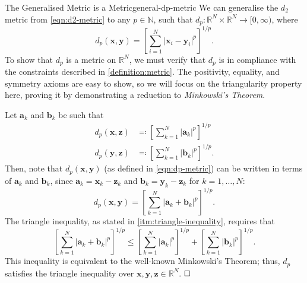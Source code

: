 \documentclass{article}
\renewcommand*\vec{\mathbf}
\renewcommand*\qedsymbol{\hfill\ensuremath{\Box}}
\numberwithin{equation}{section}
\numberwithin{enumi}{section}
\begin{document}
\begin{theorem}{The Generalised Metric is a Metric}{general-dp-metric}
    We can generalise the $d_2$ metric from \cref{eqn:d2-metric} to any $ p
    \in \mathbb{N} $, such that $ d_p \colon \mathbb{R}^N \times \mathbb{R}^N
    \to [0, \infty) $, where
    \begin{equation}
        d_p(\vec{x}, \vec{y}) = \left[\sum_{i=1}^N \vert \vec{x}_i - \vec{y}_i
            \vert^p\right]^{1/p} \label{eqn:dp-metric}.
    \end{equation}
    To show that $ d_p $ is a metric on $ \mathbb{R}^N $, we must verify that $
    d_p $ is in compliance with the constraints described in
    \cref{definition:metric}. The positivity, equality, and symmetry axioms are
    easy to show, so we will focus on the triangularity property here, proving
    it by demonstrating a reduction to \emph{Minkowski's Theorem}.

    Let $ \vec{a}_k $ and $ \vec{b}_k $ be such that
    \begin{align}
        d_p(\vec{x}, \vec{z}) &\eqcolon \left[\sum_{k=1}^N \vert \vec{a}_k
            \vert^p\right]^{1/p} \\
        d_p(\vec{y}, \vec{z}) &\eqcolon \left[\sum_{k=1}^N \vert \vec{b}_k
            \vert^p\right]^{1/p}.
    \end{align}
    Then, note that $ d_p(\vec{x}, \vec{y}) $ (as defined in
    \cref{eqn:dp-metric}) can be
    written in terms of $ \vec{a}_k $ and $ \vec{b}_k $, since $ \vec{a}_k =
    \vec{x}_k - \vec{z}_k $ and $ \vec{b}_k = \vec{y}_k - \vec{z}_k $ for
    $ k = 1, \ldots, N $:
    \begin{equation}
        d_p(\vec{x}, \vec{y}) = \left[\sum_{k=1}^N \vert \vec{a}_k + \vec{b}_k
            \vert^p\right]^{1/p}.
    \end{equation}
    The triangle inequality, as stated in \cref{itm:triangle-inequality},
    requires that
    \begin{equation}
        \left[\sum_{k=1}^N \vert \vec{a}_k + \vec{b}_k \vert^p\right]^{1/p} \leq
        \left[\sum_{k=1}^N \vert \vec{a}_k \vert^p\right]^{1/p} +
        \left[\sum_{k=1}^N \vert \vec{b}_k \vert^p\right]^{1/p}.
    \end{equation}
    This inequality is equivalent to the well-known Minkowski's Theorem; thus,
    $ d_p $ satisfies the triangle inequality over $ \vec{x}, \vec{y}, \vec{z}
    \in \mathbb{R}^N $. $ \qedsymbol $
\end{theorem}
\end{document}
